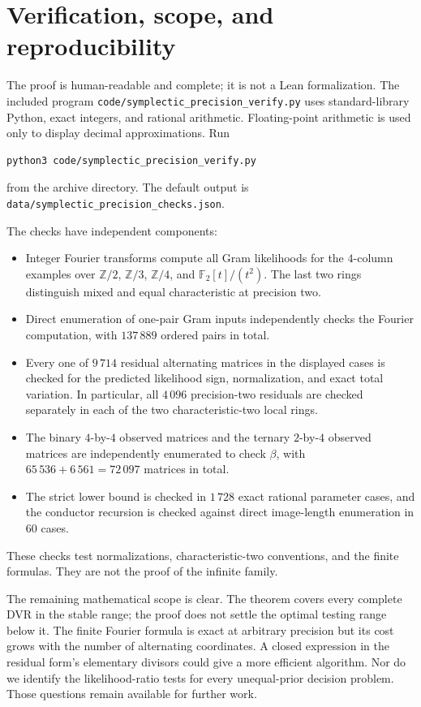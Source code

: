 \documentclass[11pt]{article}
\theoremstyle{remark}
\newcommand{\FF}{\mathbb F}
\begin{document}
\section{Verification, scope, and reproducibility}

The proof is human-readable and complete; it is not a Lean formalization.
The included program \texttt{code/symplectic\_precision\_verify.py}
uses standard-library Python, exact integers, and rational arithmetic.
Floating-point arithmetic is used only to display decimal approximations.
Run
\begin{verbatim}
python3 code/symplectic_precision_verify.py
\end{verbatim}
from the archive directory. The default output is
\texttt{data/symplectic\_precision\_checks.json}.

The checks have independent components:
\begin{itemize}
\item Integer Fourier transforms compute all Gram likelihoods for the
  \(4\)-column examples over \(\mathbb Z/2\), \(\mathbb Z/3\),
  \(\mathbb Z/4\), and \(\FF_2[t]/(t^2)\).
  The last two rings distinguish mixed and equal characteristic at
  precision two.
\item Direct enumeration of one-pair Gram inputs independently checks the
  Fourier computation, with \(137\,889\) ordered pairs in total.
\item Every one of \(9\,714\) residual alternating matrices in the displayed
  cases is checked for the predicted likelihood sign, normalization, and
  exact total variation. In particular, all \(4\,096\) precision-two
  residuals are checked separately in each of the two characteristic-two
  local rings.
\item The binary \(4\)-by-\(4\) observed matrices and the ternary
  \(2\)-by-\(4\) observed matrices are independently enumerated to check
  \(\beta\), with \(65\,536+6\,561=72\,097\) matrices in total.
\item The strict lower bound is checked in \(1\,728\) exact rational
  parameter cases, and the conductor recursion is checked against direct
  image-length enumeration in \(60\) cases.
\end{itemize}
These checks test normalizations, characteristic-two conventions, and the
finite formulas. They are not the proof of the infinite family.

The remaining mathematical scope is clear. The theorem covers every
complete DVR in the stable range; the proof does not settle the optimal
testing range below it. The finite Fourier formula is exact at arbitrary
precision but its cost grows with the number of alternating coordinates.
A closed expression in the residual form's elementary divisors could
give a more efficient algorithm. Nor do we identify the likelihood-ratio
tests for every unequal-prior decision problem. Those questions remain
available for further work.
\end{document}
